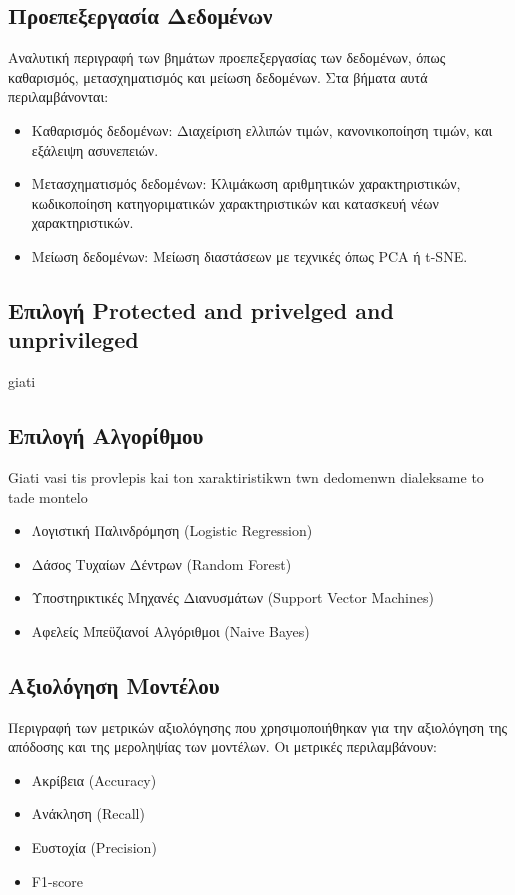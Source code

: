 \documentclass[12pt,twoside]{article}
\begin{document}
\subsection{Προεπεξεργασία Δεδομένων}
Αναλυτική περιγραφή των βημάτων προεπεξεργασίας των δεδομένων, όπως καθαρισμός, μετασχηματισμός και μείωση δεδομένων. Στα βήματα αυτά περιλαμβάνονται:
\begin{itemize}
    \item Καθαρισμός δεδομένων: Διαχείριση ελλιπών τιμών, κανονικοποίηση τιμών, και εξάλειψη ασυνεπειών.
    \item Μετασχηματισμός δεδομένων: Κλιμάκωση αριθμητικών χαρακτηριστικών, κωδικοποίηση κατηγοριματικών χαρακτηριστικών και κατασκευή νέων χαρακτηριστικών.
    \item Μείωση δεδομένων: Μείωση διαστάσεων με τεχνικές όπως PCA ή t-SNE.
\end{itemize}

\subsection{Επιλογή Protected and privelged and unprivileged}
giati 

\subsection{Επιλογή Αλγορίθμου}
Giati vasi tis provlepis kai ton xaraktiristikwn twn dedomenwn dialeksame to tade montelo 
\begin{itemize}
    \item Λογιστική Παλινδρόμηση (Logistic Regression)
    \item Δάσος Τυχαίων Δέντρων (Random Forest)
    \item Υποστηρικτικές Μηχανές Διανυσμάτων (Support Vector Machines)
    \item Αφελείς Μπεϋζιανοί Αλγόριθμοι (Naive Bayes)
\end{itemize}

\subsection{Αξιολόγηση Μοντέλου}
Περιγραφή των μετρικών αξιολόγησης που χρησιμοποιήθηκαν για την αξιολόγηση της απόδοσης και της μεροληψίας των μοντέλων. Οι μετρικές περιλαμβάνουν:
\begin{itemize}
    \item Ακρίβεια (Accuracy)
    \item Ανάκληση (Recall)
    \item Ευστοχία (Precision)
    \item F1-score
\end{itemize}
\end{document}
